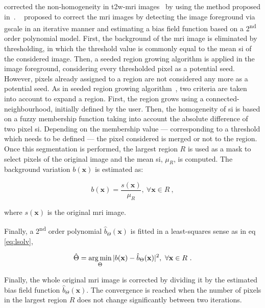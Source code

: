 \begin{enumerate}[leftmargin=*]
\citeauthor{Lv2009} corrected the non-homogeneity in \ac{t2w}-\ac{mri}
images~\cite{Lv2009} by using the method proposed in~\cite{Madabhushi2006}.
\citeauthor{Madabhushi2006}~\cite{Madabhushi2006} proposed to correct the
\ac{mri} images by detecting the image foreground via \ac{gscale} in an
iterative manner and estimating a bias field function based on a
2\textsuperscript{nd} order polynomial model.
First, the background of the \ac{mri} image is eliminated by thresholding, in
which the threshold value is commonly equal to the mean \ac{si} of the
considered image.
Then, a seeded region growing algorithm is applied in the image foreground,
considering every thresholded pixel as a potential seed.
However, pixels already assigned to a region are not considered any more as a
potential seed.
As in seeded region growing algorithm~\cite{Shapiro2001}, two criteria are
taken into account to expand a region.
First, the region grows using a connected-neighbourhood, initially defined by
the user.
Then, the homogeneity of \ac{si} is based on a fuzzy membership function taking
into account the absolute difference of two pixel \ac{si}.
Depending on the membership value --- corresponding to a threshold which needs
to be defined --- the pixel considered is merged or not to the region.
Once this segmentation is performed, the largest region $R$ is used as a mask
to select pixels of the original image and the mean \ac{si}, $\mu_{R}$, is
computed.
The background variation $b(\mathbf{x})$ is estimated as:

\begin{equation}
  b(\mathbf{x}) = \frac{s(\mathbf{x})}{\mu_{R}}, \ \forall \mathbf{x} \in R \ ,
  \label{eq:backest}
\end{equation}

\noindent where $s(\mathbf{x})$ is the original \ac{mri} image.

Finally, a 2\textsuperscript{nd} order polynomial
$\hat{b}_{\Theta}(\mathbf{x})$ is fitted in a least-squares sense as in
\acs{eq}\,\eqref{eq:lsolv},

\begin{equation}
  \hat{\Theta} = \operatorname*{arg\,min}_{\Theta} | b(\mathbf{x}) -
  \hat{b}_{\Theta}(\mathbf{x}) |^{2}, \ \forall \mathbf{x} \in R \ .
  \label{eq:lsolv}
\end{equation}

Finally, the whole original \ac{mri} image is corrected by dividing it by the
estimated bias field function $\hat{b}_{\Theta}(\mathbf{x})$.
The convergence is reached when the number of pixels in the largest region $R$
does not change significantly between two iterations.


\end{enumerate}
